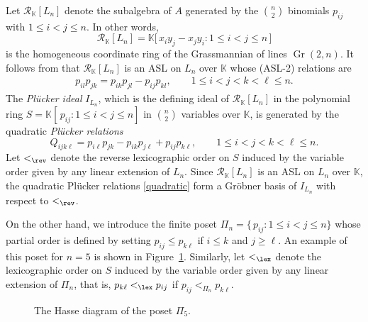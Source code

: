 \documentclass[12pt,a4paper]{amsart}
\def\Rc{{\mathcal R}}
\DeclareMathOperator{\Gr}{Gr}
\theoremstyle{definition}
\begin{document}
Let $\Rc_{\mathbb{K}}[L_n]$ denote the subalgebra of $A$ generated by the $\binom{n}{2}$ binomials $p_{ij}$ with $1\le i<j\le n$. In other words,
\[
\Rc_{\mathbb{K}}[L_n]=\mathbb{K}\big[\,x_i y_j - x_j y_i : 1\le i<j\le n\,\big]
\]
is the homogeneous coordinate ring of the Grassmannian of lines $\Gr(2,n)$.
It follows from \cite{DEP80} that $\Rc_\mathbb{K}[L_n]$ is an
ASL on $L_n$ over $\mathbb{K}$ whose (ASL-2) relations are 
\begin{eqnarray}
\label{(ASL-2)}
    p_{il}p_{jk} = p_{ik}p_{jl} - p_{ij}p_{kl}, \qquad 1\leq i<j<k<\ell\leq n.
\end{eqnarray}
The {\em Pl\"ucker ideal} $I_{L_n}$, which is the defining ideal of $\Rc_\mathbb{K}[L_n]$ in the polynomial ring $S=\mathbb{K}[\,p_{ij} : 1 \leq i < j \leq n]$ in ${n \choose 2}$ variables over $\mathbb{K}$, is generated by the quadratic {\em Pl\"ucker relations}
\begin{equation}\label{quadratic}
    Q_{ijk\ell} = p_{i\ell}p_{jk} - p_{ik}p_{j\ell} + p_{ij}p_{k\ell}, 
\qquad 1\leq i<j<k<\ell\leq n.  
\end{equation}
Let $<_{\rev}$ denote the reverse lexicographic order on $S$ induced by the variable order given by any linear extension of $L_n$. %
Since $\Rc_\mathbb{K}[L_n]$ is an ASL on $L_n$ over $\mathbb{K}$, the  quadratic Pl\"ucker relations \eqref{quadratic}
form a Gr\"obner basis of $I_{L_n}$ with respect to $<_{\rev}$.  

\smallskip 

On the other hand, we introduce the finite poset $\Pi_n=\{\,p_{ij} : 1 \leq i < j \leq n \}$ whose partial order is defined by setting $p_{ij} \leq p_{k\ell}$ if $i \leq k$ and $j \geq \ell$.  An example of this poset for $n=5$ is shown in Figure~\ref{fig: HassePi5}. Similarly, let $<_{\lex}$ denote the lexicographic order \cite[Example 2.1.2(a)]{HHgtm260} on $S$ induced by the variable order given by any linear extension of $\Pi_n$, that is, $p_{k \ell} <_{\lex} p_{ij}$ if $p_{ij} <_{\Pi_n} p_{k\ell}$.  



\begin{figure}
    \centering
{}
    \caption{The Hasse diagram of the poset $\Pi_5$.}
    \label{fig: HassePi5}
\end{figure}
\end{document}
